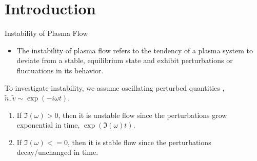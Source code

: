 \section{Introduction}
\begin{frame}{Instability of Plasma Flow}
  \begin{itemize}
    \item The instability of plasma flow refers to the tendency of a plasma system to deviate from a stable, equilibrium state and exhibit perturbations or fluctuations in its behavior. \cite{chen_introduction_2016}
  \end{itemize}  
  To investigate instability, we assume oscillating perturbed quantities , $\tilde{n}, \tilde{v} \sim \exp(-i\omega t)$.
  \begin{enumerate}
    \item If $\Im(\omega) > 0$, then it is unstable flow since the perturbations grow exponential in time, $\exp(\Im(\omega) t)$. 
    \item If $\Im(\omega) <=0$, then it is stable flow since the perturbations decay/unchanged in time.
  \end{enumerate}
\end{frame}

